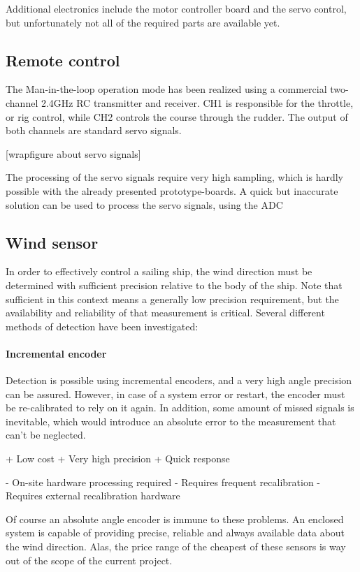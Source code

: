 Additional electronics include the motor controller board and the servo control, but unfortunately not all of the required parts are available yet.

\subsection{Remote control}

The Man-in-the-loop operation mode has been realized using a commercial two-channel 2.4GHz RC transmitter and receiver. CH1 is responsible for the throttle, or rig control, while CH2 controls the course through the rudder. The output of both channels are standard servo signals.

[wrapfigure about servo signals]

The processing of the servo signals require very high sampling, which is hardly possible with the already presented prototype-boards. A quick but inaccurate solution can be used to process the servo signals, using the ADC

\subsection{Wind sensor}

In order to effectively control a sailing ship, the wind direction must be determined with sufficient precision relative to the body of the ship. Note that sufficient in this context means a generally low precision requirement, but the availability and reliability of that measurement is critical. Several different methods of detection have been investigated:

\paragraph{Incremental encoder} Detection is possible using incremental encoders, and a very high angle precision can be assured. However, in case of a system error or restart, the encoder must be re-calibrated to rely on it again. In addition, some amount of missed signals is inevitable, which would introduce an absolute error to the measurement that can't be neglected.

+ Low cost
+ Very high precision
+ Quick response

- On-site hardware processing required
- Requires frequent recalibration
- Requires external recalibration hardware

Of course an absolute angle encoder is immune to these problems. An enclosed system is capable of providing precise, reliable and always available data about the wind direction. Alas, the price range of the cheapest of these sensors is way out of the scope of the current project.

